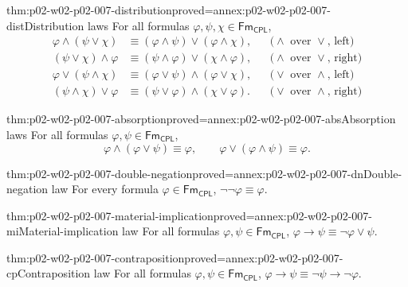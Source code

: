 \begin{hblemma}{thm:p02-w02-p02-007-distribution}{proved=annex:p02-w02-p02-007-dist}{Distribution laws}
For all formulas \(\varphi,\psi,\chi\in\mathsf{Fm}_{\mathsf{CPL}}\),
\[
\begin{aligned}
 \varphi\land(\psi\lor\chi)&\equiv(\varphi\land\psi)\lor(\varphi\land\chi),
   &&\text{(}\land\text{ over }\lor\text{, left)}\\
 (\psi\lor\chi)\land\varphi&\equiv(\psi\land\varphi)\lor(\chi\land\varphi),
   &&\text{(}\land\text{ over }\lor\text{, right)}\\
 \varphi\lor(\psi\land\chi)&\equiv(\varphi\lor\psi)\land(\varphi\lor\chi),
   &&\text{(}\lor\text{ over }\land\text{, left)}\\
 (\psi\land\chi)\lor\varphi&\equiv(\psi\lor\varphi)\land(\chi\lor\varphi).
   &&\text{(}\lor\text{ over }\land\text{, right)}
\end{aligned}
\]
\end{hblemma}

\begin{hblemma}{thm:p02-w02-p02-007-absorption}{proved=annex:p02-w02-p02-007-abs}{Absorption laws}
For all formulas \(\varphi,\psi\in\mathsf{Fm}_{\mathsf{CPL}}\),
\[
 \varphi\land(\varphi\lor\psi)\equiv\varphi,
 \qquad
 \varphi\lor(\varphi\land\psi)\equiv\varphi.
\]
\end{hblemma}

\begin{hblemma}{thm:p02-w02-p02-007-double-negation}{proved=annex:p02-w02-p02-007-dn}{Double-negation law}
For every formula \(\varphi\in\mathsf{Fm}_{\mathsf{CPL}}\),
\(\neg\neg\varphi\equiv\varphi\).
\end{hblemma}

\begin{hblemma}{thm:p02-w02-p02-007-material-implication}{proved=annex:p02-w02-p02-007-mi}{Material-implication law}
For all formulas \(\varphi,\psi\in\mathsf{Fm}_{\mathsf{CPL}}\),
\(\varphi\to\psi\equiv\neg\varphi\lor\psi\).
\end{hblemma}

\begin{hblemma}{thm:p02-w02-p02-007-contraposition}{proved=annex:p02-w02-p02-007-cp}{Contraposition law}
For all formulas \(\varphi,\psi\in\mathsf{Fm}_{\mathsf{CPL}}\),
\(\varphi\to\psi\equiv\neg\psi\to\neg\varphi\).
\end{hblemma}

